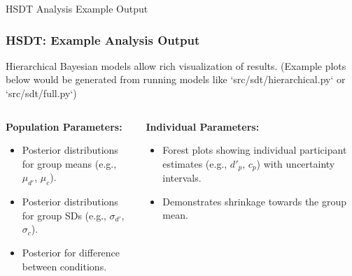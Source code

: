 \documentclass[aspectratio=169]{beamer}
\begin{document}
\begin{frame}[fragile]{HSDT Analysis Example Output}
    \frametitle{HSDT: Example Analysis Output}
    Hierarchical Bayesian models allow rich visualization of results.
    \medskip
    (Example plots below would be generated from running models like `src/sdt/hierarchical.py` or `src/sdt/full.py`)
    \pause
    \begin{columns}[T]
        \begin{column}{0.5\textwidth}
            \textbf{Population Parameters:}
            \begin{itemize}
                \item Posterior distributions for group means (e.g., $\mu_{d'}$, $\mu_c$).
                \item Posterior distributions for group SDs (e.g., $\sigma_{d'}$, $\sigma_c$).
                \item Posterior for difference between conditions.
            \end{itemize}
            \centering
             \\ \medskip
        \end{column}
        \pause
        \begin{column}{0.5\textwidth}
            \textbf{Individual Parameters:}
            \begin{itemize}
                \item Forest plots showing individual participant estimates (e.g., $d'_p$, $c_p$) with uncertainty intervals.
                \item Demonstrates shrinkage towards the group mean.
            \end{itemize}
            \centering
        \end{column}
    \end{columns}
\end{frame}
\end{document}
